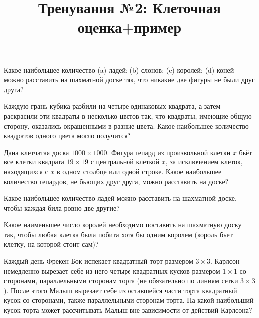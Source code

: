 



\title{Тренування №2: Клеточная оценка+пример}
\maketitle

\begin{problem}
	Какое наибольшее количество (a) ладей; (b) слонов; (c) королей; (d) коней можно расставить на шахматной доске так, что никакие две фигуры не были друг друга?
\end{problem}

\begin{problem}
	Каждую грань кубика разбили на четыре одинаковых квадрата, а затем раскрасили эти квадраты в несколько цветов так, что квадраты, имеющие общую сторону, оказались окрашенными в разные цвета. Какое наибольшее количество квадратов одного цвета могло получится?
\end{problem}

\begin{problem}
	Дана клетчатая доска $1000 \times 1000$. Фигура гепард из произвольной клетки $x$ бьёт все клетки квадрата $19 \times 19$ с центральной клеткой $x$, за исключением клеток, находящихся с $x$ в одном столбце или одной строке. Какое наибольшее количество гепардов, не бьющих друг друга, можно расставить на доске?
\end{problem}

\begin{problem}
	Какое наибольшее количество ладей можно расставить на шахматной доске, чтобы каждая била ровно две другие?
\end{problem}

\begin{problem}
	Какое наименьшее число королей необходимо поставить на шахматную доску так, чтобы любая клетка была побита хотя бы одним королем (король бьет клетку, на которой стоит сам)?
\end{problem}

\begin{problem}
	Каждый день Фрекен Бок испекает квадратный торт размером $3 \times 3$. Карлсон немедленно вырезает себе из него четыре квадратных кусков размером $1 \times 1$ со сторонами, параллельными сторонам торта (не обязательно по линиям сетки $3 \times 3$). После этого Малыш вырезает себе из оставшейся части торта квадратный кусок со сторонами, также параллельными сторонам торта. На какой наибольший кусок торта может рассчитывать Малыш вне зависимости от действий Карлсона?
\end{problem}

